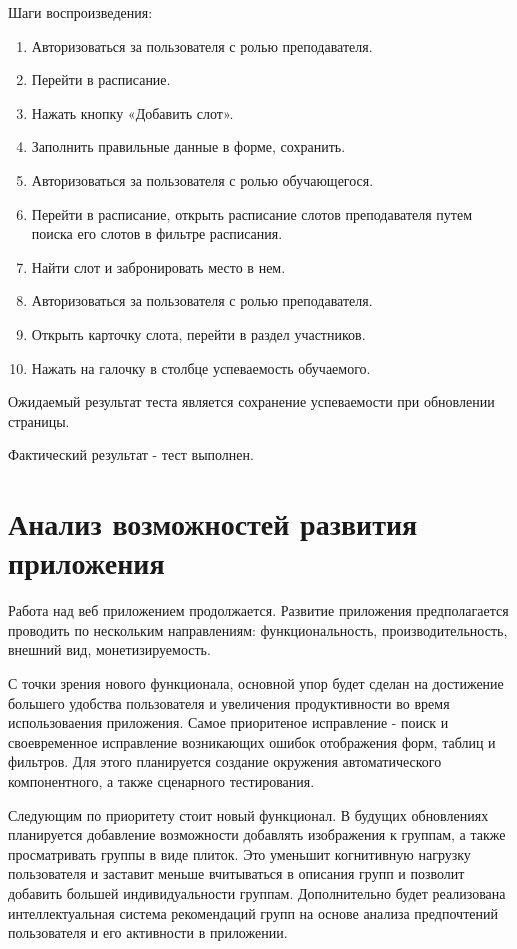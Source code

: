 \documentclass[a4paper,14pt,oneside]{extreport}
\begin{document}
Шаги воспроизведения:
\begin{enumerate}
    \item Авторизоваться за пользователя с ролью преподавателя.
    \item Перейти в расписание.
    \item Нажать кнопку «Добавить слот».
    \item Заполнить правильные данные в форме, сохранить.
    \item Авторизоваться за пользователя с ролью обучающегося.
    \item Перейти в расписание, открыть расписание слотов преподавателя путем поиска его слотов в фильтре расписания.
    \item Найти слот и забронировать место в нем.
    \item Авторизоваться за пользователя с ролью преподавателя.
    \item Открыть карточку слота, перейти в раздел участников.
    \item Нажать на галочку в столбце успеваемость обучаемого.
    
\end{enumerate}

Ожидаемый результат теста является сохранение успеваемости при обновлении страницы.

Фактический результат - тест выполнен.



\section {Анализ возможностей развития приложения}

Работа над веб приложением продолжается. Развитие приложения предполагается проводить по нескольким направлениям: функциональность, производительность, внешний вид, монетизируемость.

С точки зрения нового функционала, основной упор будет сделан на достижение большего удобства пользователя и увеличения продуктивности во время использоваения приложения. Самое приоритеное исправление - поиск и своевременное исправление возникающих ошибок отображения форм, таблиц и фильтров. Для этого планируется создание окружения автоматического компонентного, а также сценарного тестирования. 

Следующим по приоритету стоит новый функционал. В будущих обновлениях планируется добавление возможности добавлять изображения к группам, а также просматривать группы в виде плиток. Это уменьшит когнитивную нагрузку пользователя и заставит меньше вчитываться в описания групп и позволит добавить большей индивидуальности группам. Дополнительно будет реализована интеллектуальная система рекомендаций групп на основе анализа предпочтений пользователя и его активности в приложении.
\end{document}
